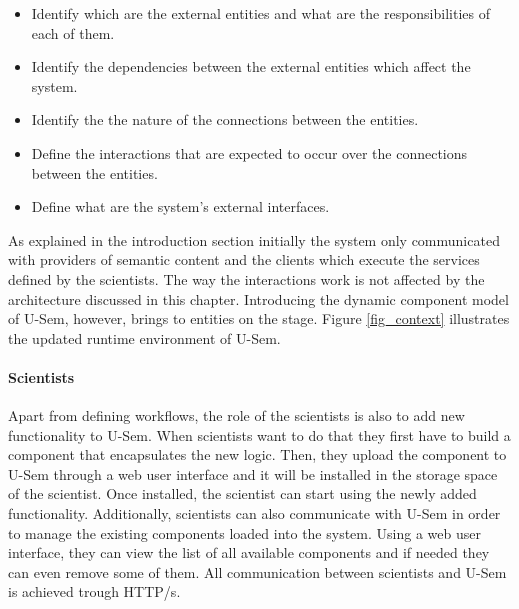 \begin{itemize}
	\item Identify which are the external entities and what are the responsibilities of each of them.
	\item Identify the dependencies between the external entities which affect the system.
	\item Identify the the nature of the connections between the entities.
	\item Define the interactions that are expected to occur over the connections between the entities.
	\item Define what are the system's external interfaces.
\end{itemize}


As explained in the introduction section initially the system only communicated with providers of semantic content and the clients which execute the services defined by the scientists. The way the interactions work is not affected by the architecture discussed in this chapter. Introducing the dynamic component model of U-Sem, however, brings to entities on the stage. Figure \ref{fig_context} illustrates the updated runtime environment of U-Sem.


\paragraph{Scientists}
Apart from defining workflows, the role of the scientists is also to add new functionality to U-Sem. When scientists want to do that they first have to build a component that encapsulates the new logic. Then, they upload the component to U-Sem through a web user interface and it will be installed in the storage space of the scientist. Once installed, the scientist can start using the newly added functionality. Additionally, scientists can also communicate with U-Sem in order to manage the existing components loaded into the system. Using a web user interface, they can view the list of all available components and if needed they can even remove some of them. All communication between scientists and U-Sem is achieved trough HTTP/s.

